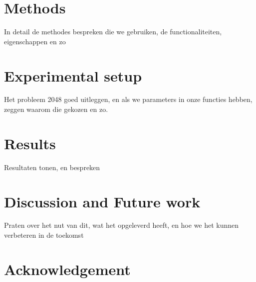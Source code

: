 \documentclass[a4paper,12pt]{article}
\begin{document}
\section{Methods}
In detail de methodes bespreken die we gebruiken, de functionaliteiten, eigenschappen en zo

\section{Experimental setup}
Het probleem 2048 goed uitleggen, en als we parameters in onze functies hebben, zeggen waarom die gekozen en zo.

\section{Results}
Resultaten tonen, en bespreken
\section{Discussion and Future work}
Praten over het nut van dit, wat het opgeleverd heeft, en hoe we het kunnen verbeteren in de toekomst
\section{Acknowledgement}



\end{document}
